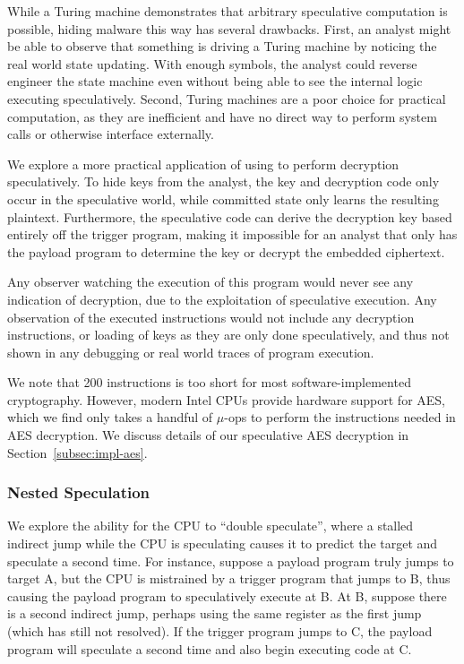 While a Turing machine demonstrates that arbitrary speculative computation
is possible, hiding malware this way has several drawbacks. First, an
analyst might be able to observe that something is driving a Turing
machine by noticing the real world state updating. With enough symbols, the
analyst could reverse engineer the state machine even without being able to see
the internal logic executing speculatively. Second, Turing machines are a
poor choice for practical computation, as they are inefficient and have no direct
way to perform system calls or otherwise interface externally.

We explore a more practical application of using \speculake to perform
decryption speculatively. To hide keys from the analyst, the key and decryption
code only occur in the speculative world, while committed state only learns the
resulting plaintext. Furthermore, the speculative code can
derive the decryption key based entirely off the trigger program, making it
impossible for an analyst that only has the payload program to
determine the key or decrypt the embedded ciphertext.


Any observer watching the execution of this program would never see any
indication of decryption, due to the exploitation of speculative execution. Any
observation of the executed instructions would not include any decryption
instructions, or loading of keys as they are only done speculatively, and thus
not shown in any debugging or real world traces of program execution. 

We note that 200 instructions is too short for most software-implemented
cryptography. However, modern Intel CPUs provide hardware support for AES, which
we find only takes a handful of $\mu$-ops to perform the instructions needed in
AES decryption. We discuss details of our speculative AES decryption in
Section~\ref{subsec:impl-aes}.

\medskip


\subsubsection{Nested Speculation}

We explore the ability for the CPU to ``double speculate'', where a stalled
indirect jump while the CPU is speculating causes it to predict the target and
speculate a second time. For instance, suppose a payload program truly jumps to
target A, but the CPU is mistrained by a trigger program that jumps to B, thus
causing the payload program to speculatively execute at B. At B, suppose there
is a second indirect jump, perhaps using the same register as the first jump
(which has still not resolved). If the trigger program jumps to C, the payload
program will speculate a second time and also begin executing code at C.

